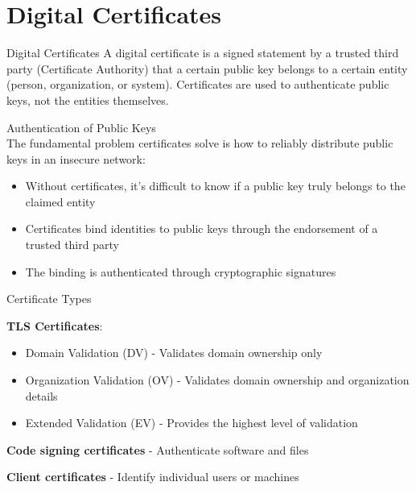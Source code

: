 \section{Digital Certificates}

\small



\begin{definition}{Digital Certificates}
A digital certificate is a signed statement by a trusted third party (Certificate Authority) that a certain public key belongs to a certain entity (person, organization, or system). Certificates are used to authenticate public keys, not the entities themselves.
\end{definition}


\begin{concept}{Authentication of Public Keys}\\
The fundamental problem certificates solve is how to reliably distribute public keys in an insecure network:
\begin{itemize}
    \item Without certificates, it's difficult to know if a public key truly belongs to the claimed entity
    \item Certificates bind identities to public keys through the endorsement of a trusted third party
    \item The binding is authenticated through cryptographic signatures
\end{itemize}
\end{concept}



\begin{definition}{Certificate Types}

    \textbf{TLS Certificates}:
    \begin{itemize}
        \item Domain Validation (DV) - Validates domain ownership only
        \item Organization Validation (OV) - Validates domain ownership and organization details
        \item Extended Validation (EV) - Provides the highest level of validation
    \end{itemize}
\textbf{Code signing certificates} - Authenticate software and files

\textbf{Client certificates} - Identify individual users or machines
\end{definition}

